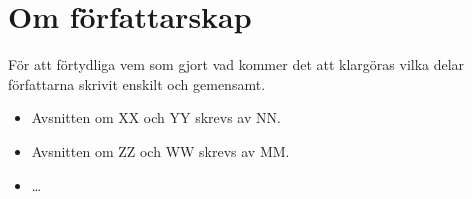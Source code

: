 \section{Om författarskap}
För att förtydliga vem som gjort vad kommer det att klargöras vilka delar
författarna skrivit enskilt och gemensamt.

\begin{itemize}
  \item Avsnitten om XX och YY skrevs av NN.
  \item Avsnitten om ZZ och WW skrevs av MM.
  \item \ldots
\end{itemize}

